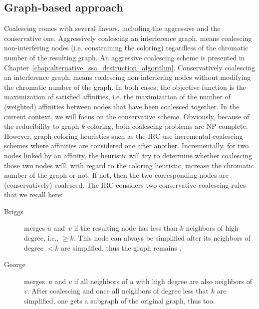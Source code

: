 {\subsection{Graph-based approach}
Coalescing comes with several flavors, including the aggressive and the conservative one.
Aggressively coalescing an interference graph, means coalescing non-interfering nodes (i.e. constraining the coloring) regardless of the chromatic number of the resulting graph. 
An aggressive coalescing scheme is presented in Chapter~\ref{chap:alternative_ssa_destruction_algorithm}.
Conservatively coalescing an interference graph, means coalescing non-interfering nodes without modifying the chromatic number of the graph.
In both cases, the objective function is the maximization of satisfied affinities, i.e. the maximization of the number of (weighted) affinities between nodes that have been coalesced together.
In the current context, we will focus on the conservative scheme.
Obviously, because of the reducibility to graph-$k$-coloring, both coalescing problems are NP-complete.
However, graph coloring heuristics such as the IRC use incremental coalescing schemes where affinities are considered one after another.
Incrementally, for two nodes linked by an affinity, the heuristic will try to determine whether coalescing those two nodes will, with regard to the coloring heuristic, increase the chromatic number of the graph or not.
If not, then the two corresponding nodes are (conservatively) coalesced.
The IRC considers two conservative coalescing rules that we recall here:
\begin{description}
  \item[Briggs] merges $u$ and~$v$ if the resulting node has 
    less than $k$ neighbors of high degree, i.e., $\geq k$. This node can 
    always be simplified after its neighbors of degree $<k$ are simplified, 
    thus the graph remains .

  \item[George] merges~$u$ and $v$ if all neighbors of $u$ with 
    high degree are also neighbors of $v$. After coalescing and once all 
    neighbors of degree less that $k$ are simplified, one gets a subgraph of 
    the original graph, thus  too.
\end{description}


}
